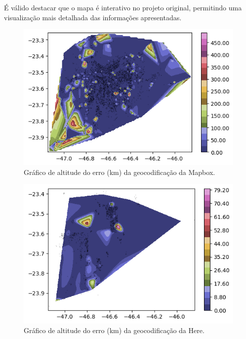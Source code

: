 \documentclass{article}
\begin{document}
É válido destacar que o mapa é interativo no projeto original, permitindo uma visualização mais detalhada das informações apresentadas.

\begin{figure}[h]
  \centering
  \includegraphics[width=\textwidth]{graficoAltPontosMapbox.png}
  \caption{Gráfico de altitude do erro (km) da geocodificação da Mapbox.}
  \label{fig:grafAltM}
\end{figure}

\begin{figure}[h]
  \centering
  \includegraphics[width=\textwidth]{graficoAltPontosHere.png}
  \caption{Gráfico de altitude do erro (km) da geocodificação da Here.}
  \label{fig:grafAltH}
\end{figure}
\end{document}
